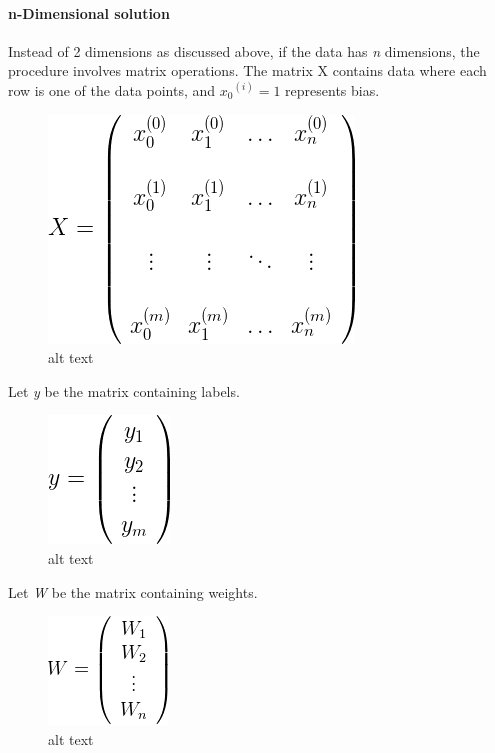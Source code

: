 \documentclass[11pt]{article}
\makeatletter
\def\maxwidth{\ifdim\Gin@nat@width>\linewidth\linewidth
    \else\Gin@nat@width\fi}
\let\Oldincludegraphics\includegraphics
\renewcommand{\includegraphics}[1]{\Oldincludegraphics[width=.8\maxwidth]{#1}}
\makeatother
\begin{document}
    \hypertarget{n-dimensional-solution}{%
\paragraph{n-Dimensional solution}\label{n-dimensional-solution}}

Instead of 2 dimensions as discussed above, if the data has \emph{n}
dimensions, the procedure involves matrix operations. The matrix X
contains data where each row is one of the data points, and
\({x_0}^{(i)} = 1\) represents bias.

    \begin{figure}
\centering
\includegraphics{X.gif}
\caption{alt text}
\end{figure}

    Let \emph{y} be the matrix containing labels.

\begin{figure}
\centering
\includegraphics{y.gif}
\caption{alt text}
\end{figure}

    Let \emph{W} be the matrix containing weights.

\begin{figure}
\centering
\includegraphics{W.gif}
\caption{alt text}
\end{figure}
\end{document}
